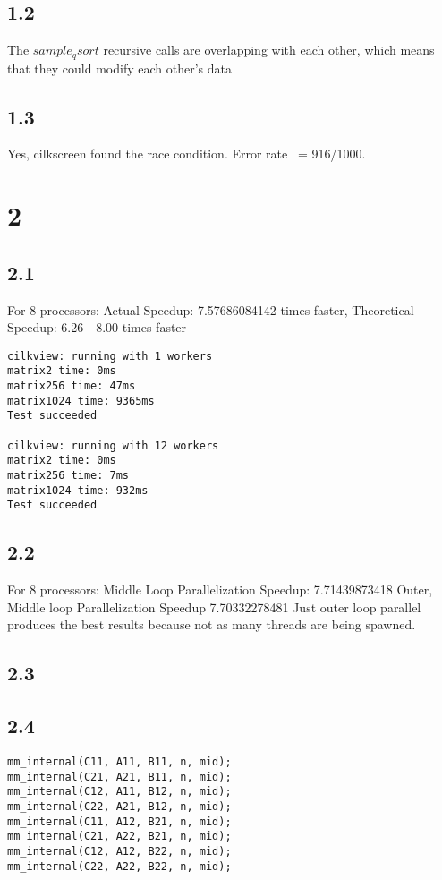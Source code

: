 \documentclass[12pt]{article}
\begin{document}
\subsection{1.2}
The $sample_qsort$ recursive calls are overlapping with each other, which means 
that they could modify each other's data

\subsection{1.3}
Yes, cilkscreen found the race condition.  Error rate ~= 916/1000.

\section{2}
\subsection{2.1}
For 8 processors:
Actual Speedup:  7.57686084142 times faster, 
Theoretical Speedup:  6.26 - 8.00 times faster

\begin{verbatim}
cilkview: running with 1 workers
matrix2 time: 0ms
matrix256 time: 47ms
matrix1024 time: 9365ms
Test succeeded

cilkview: running with 12 workers
matrix2 time: 0ms
matrix256 time: 7ms
matrix1024 time: 932ms
Test succeeded
\end{verbatim}

\subsection{2.2}
For 8 processors: 
Middle Loop Parallelization Speedup: 7.71439873418
Outer, Middle loop Parallelization Speedup  7.70332278481
Just outer loop parallel produces the best results because not as many threads are being spawned.  

\subsection{2.3}

\subsection{2.4}
\begin{verbatim}
mm_internal(C11, A11, B11, n, mid);
mm_internal(C21, A21, B11, n, mid);
mm_internal(C12, A11, B12, n, mid);
mm_internal(C22, A21, B12, n, mid);
mm_internal(C11, A12, B21, n, mid);
mm_internal(C21, A22, B21, n, mid);
mm_internal(C12, A12, B22, n, mid);
mm_internal(C22, A22, B22, n, mid);
\end{verbatim}
\end{document}
